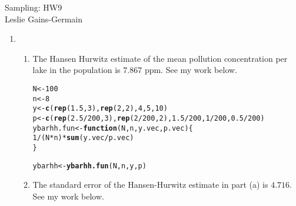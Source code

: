 \documentclass[12pt]{article}\usepackage[]{graphicx}\usepackage[]{color}
\makeatletter
\newcommand{\hlnum}[1]{\textcolor[rgb]{0.686,0.059,0.569}{#1}}%
\newcommand{\hlopt}[1]{\textcolor[rgb]{0,0,0}{#1}}%
\newcommand{\hlstd}[1]{\textcolor[rgb]{0.345,0.345,0.345}{#1}}%
\newcommand{\hlkwa}[1]{\textcolor[rgb]{0.161,0.373,0.58}{\textbf{#1}}}%
\newcommand{\hlkwb}[1]{\textcolor[rgb]{0.69,0.353,0.396}{#1}}%
\newcommand{\hlkwc}[1]{\textcolor[rgb]{0.333,0.667,0.333}{#1}}%
\newcommand{\hlkwd}[1]{\textcolor[rgb]{0.737,0.353,0.396}{\textbf{#1}}}%
\newenvironment{kframe}{%
 \def\at@end@of@kframe{}%
 \ifinner\ifhmode%
  \def\at@end@of@kframe{\end{minipage}}%
  \begin{minipage}{\columnwidth}%
 \fi\fi%
 \def\FrameCommand##1{\hskip\@totalleftmargin \hskip-\fboxsep
 \colorbox{shadecolor}{##1}\hskip-\fboxsep
     \hskip-\linewidth \hskip-\@totalleftmargin \hskip\columnwidth}%
 \MakeFramed {\advance\hsize-\width
   \@totalleftmargin\z@ \linewidth\hsize
   \@setminipage}}%
 {\par\unskip\endMakeFramed%
 \at@end@of@kframe}
\newenvironment{knitrout}{}{} %
\makeatother
\begin{document}
  
  
  \begin{center}
\large{Sampling: HW9} \\
Leslie Gains-Germain
\end{center}

\begin{doublespacing}

\begin{enumerate}

\item \begin{enumerate}

\item The Hansen Hurwitz estimate of the mean pollution concentration per lake in the population is $7.867$ ppm. See my work below.

\begin{singlespace}
\begin{knitrout}\footnotesize
{}\color{fgcolor}\begin{kframe}
\begin{alltt}
\hlstd{N} \hlkwb{<-} \hlnum{100}
\hlstd{n} \hlkwb{<-} \hlnum{8}
\hlstd{y} \hlkwb{<-} \hlkwd{c}\hlstd{(}\hlkwd{rep}\hlstd{(}\hlnum{1.5}\hlstd{,} \hlnum{3}\hlstd{),} \hlkwd{rep}\hlstd{(}\hlnum{2}\hlstd{,} \hlnum{2}\hlstd{),} \hlnum{4}\hlstd{,} \hlnum{5}\hlstd{,} \hlnum{10}\hlstd{)}
\hlstd{p} \hlkwb{<-} \hlkwd{c}\hlstd{(}\hlkwd{rep}\hlstd{(}\hlnum{2.5}\hlopt{/}\hlnum{200}\hlstd{,} \hlnum{3}\hlstd{),} \hlkwd{rep}\hlstd{(}\hlnum{2}\hlopt{/}\hlnum{200}\hlstd{,} \hlnum{2}\hlstd{),} \hlnum{1.5}\hlopt{/}\hlnum{200}\hlstd{,} \hlnum{1}\hlopt{/}\hlnum{200}\hlstd{,} \hlnum{0.5}\hlopt{/}\hlnum{200}\hlstd{)}
\hlstd{ybarhh.fun} \hlkwb{<-} \hlkwa{function}\hlstd{(}\hlkwc{N}\hlstd{,} \hlkwc{n}\hlstd{,} \hlkwc{y.vec}\hlstd{,} \hlkwc{p.vec}\hlstd{) \{}
  \hlnum{1}\hlopt{/}\hlstd{(N}\hlopt{*}\hlstd{n)}\hlopt{*}\hlkwd{sum}\hlstd{(y.vec}\hlopt{/}\hlstd{p.vec)}
\hlstd{\}}

\hlstd{ybarhh} \hlkwb{<-} \hlkwd{ybarhh.fun}\hlstd{(N, n, y, p)}
\end{alltt}
\end{kframe}
\end{knitrout}
\end{singlespace}

\item The standard error of the Hansen-Hurwitz estimate in part (a) is $4.716$. See my work below.


\end{enumerate}
\end{enumerate}
\end{doublespacing}
\end{document}
